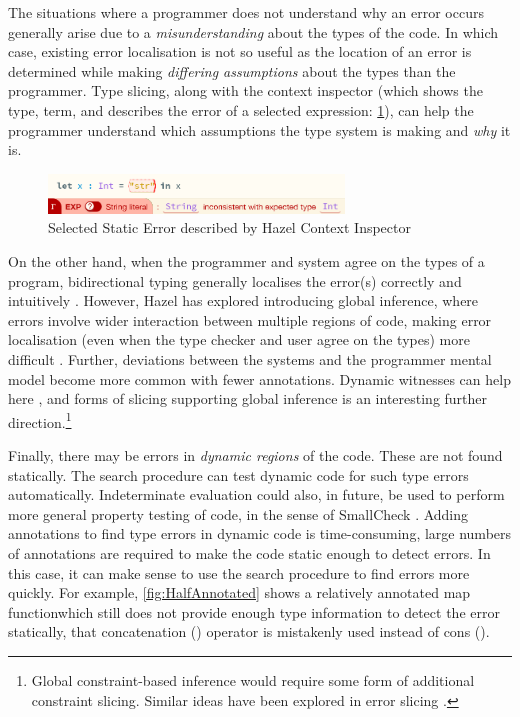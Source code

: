 The situations where a programmer does not understand why an error occurs generally arise due to a \textit{misunderstanding} about the types of the code. In which case, existing error localisation is not so useful as the location of an error is determined while making \textit{differing assumptions} about the types than the programmer. Type slicing, along with the context inspector (which shows the type, term, and describes the error of a selected expression: \cref{fig:ContextInspector}), can help the programmer understand which assumptions the type system is making and \textit{why} it is. 

\begin{figure}[h]\centering
\includegraphics[width=0.7\textwidth]{Media/Figures/context_inspector}
\caption{Selected Static Error described by Hazel Context Inspector}
\label{fig:ContextInspector}
\end{figure}

On the other hand, when the programmer and system agree on the types of a program, bidirectional typing generally localises the error(s) correctly and intuitively \cite{BidirectionalTypes, MarkedLocalisation}. However, Hazel has explored introducing global inference, where errors involve wider interaction between multiple regions of code, making error localisation (even when the type checker and user agree on the types) more difficult \cite{StudentTypeErrorFixes}. Further, deviations between the systems and the programmer mental model become more common with fewer annotations. Dynamic witnesses can help here \cite{SearchProc}, and forms of slicing supporting global inference is an interesting further direction.\footnote{Global constraint-based inference would require some form of additional constraint slicing. Similar ideas have been explored in error slicing \cite{ErrSlice, HaackErrSlice}.}

Finally, there may be errors in \textit{dynamic regions} of the code. These are not found statically. The search procedure can test dynamic code for such type errors automatically. Indeterminate evaluation could also, in future, be used to perform more general property testing of code, in the sense of SmallCheck \cite{SmallCheck}. Adding annotations to find type errors in dynamic code is time-consuming, large numbers of annotations are required to make the code static enough to detect errors. In this case, it can make sense to use the search procedure to find errors more quickly. For example, \cref{fig:HalfAnnotated} shows a relatively annotated map functionwhich still does not provide enough type information to detect the error statically, that concatenation () operator is mistakenly used instead of cons (\code{::}).


